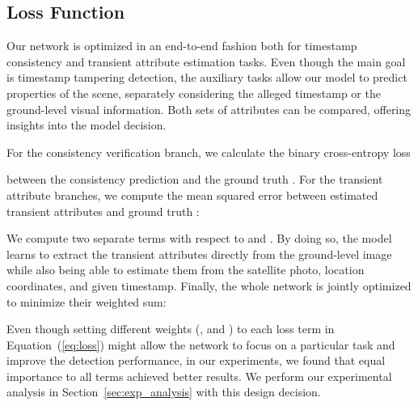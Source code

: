 \documentclass[journal]{IEEEtran}
\begin{document}
    \subsection{Loss Function}
        Our network is optimized in an end-to-end fashion both for timestamp consistency and transient attribute estimation tasks. Even though the main goal is timestamp tampering detection, the auxiliary tasks allow our model to predict properties of the scene, separately considering the alleged timestamp or the ground-level visual information. Both sets of attributes can be compared, offering insights into the model decision. 
        
        For the consistency verification branch, we calculate the binary cross-entropy loss

        
        \noindent between the consistency prediction  and the ground truth . For the transient attribute branches, we compute the mean squared error between estimated transient attributes  and ground truth :

        
        \noindent We compute two separate  terms with respect to  and . By doing so, the model learns to extract the transient attributes directly from the ground-level image while also being able to estimate them from the satellite photo, location coordinates, and given timestamp. Finally, the whole network is jointly optimized to minimize their weighted sum:



        \noindent Even though setting different weights (,  and ) to each loss term in Equation~(\ref{eq:loss}) might allow the network to focus on a particular task and improve the detection performance, in our experiments, we found that equal importance to all terms achieved better results. We perform our experimental analysis in Section~\ref{sec:exp_analysis} with this design decision.
\end{document}
